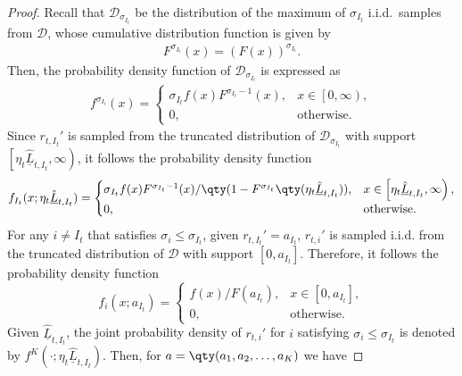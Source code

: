 \begin{proof}
    Recall that $\mathcal{D}_{\sigma_{I_t}}$ be the distribution of the maximum of $\sigma_{I_t}$ i.i.d.~samples from $\mathcal{D}$, whose cumulative distribution function is given by 
    \begin{align*}
        F^{\sigma_{I_t}}(x)=(F(x))^{\sigma_{I_t}}.
    \end{align*}
    Then, the probability density function of $\mathcal{D}_{\sigma_{I_t}}$ is expressed as 
    \begin{align*}
        f^{\sigma_{I_t}}(x)=\begin{cases}
            \sigma_{I_t}f(x)F^{\sigma_{I_t}-1}(x), & x\in\left[0, \infty\right), \\
            0, & \text{otherwise}.
        \end{cases}
    \end{align*}
    Since $r_{t,I_t}'$ is sampled from the truncated distribution of $\mathcal{D}_{\sigma_{I_t}}$ with support $\left[\eta_t\underline{\hat{L}}_{t,I_t}, \infty\right)$, it follows the probability density function 
    \begin{equation*}
        f_{I_t}(x; \eta_t\underline{\hat{L}}_{t,I_t})=
        \begin{cases}
            \sigma_{I_t}f(x)F^{\sigma_{I_t}-1}(x)/\qty(1-F^{\sigma_{I_t}}\qty(\eta_t\underline{\hat{L}}_{t,I_t})), & x\in\left[\eta_t\underline{\hat{L}}_{t,I_t}, \infty\right), \\
            0, & \text{otherwise}.
        \end{cases}
    \end{equation*}
    For any $i\neq I_t$ that satisfies $\sigma_i\leq\sigma_{I_t}$, given $r_{t,I_t}'=a_{I_t}$, $r_{t,i}'$ is sampled i.i.d. from the truncated distribution of $\mathcal{D}$ with support $\left[0, a_{I_t}\right]$. Therefore, it follows the probability density function 
    \begin{equation*}
        f_i(x; a_{I_t})=
        \begin{cases}
            f(x)/F(a_{I_t}), & x\in\left[0, a_{I_t}\right], \\
            0, & \text{otherwise}.
        \end{cases}
    \end{equation*}
    Given $\underline{\hat{L}}_{t,I_t}$, the joint probability density of $r_{t,i}'$ for $i$ satisfying $\sigma_i\leq\sigma_{I_t}$ is denoted by $f^K(\cdot; \eta_t\underline{\hat{L}}_{t,I_t})$. 
    Then, for $a=\qty(a_1,a_2,\dots, a_K)$ we have

\end{proof}
